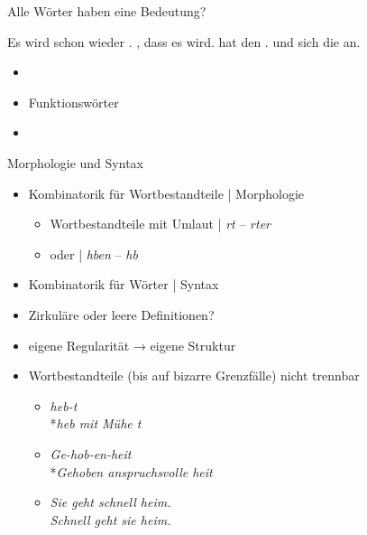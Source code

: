 \begin{frame}
  {Alle Wörter haben eine Bedeutung?}
  \onslide<+->
  \onslide<+->
  \begin{exe}
    \ex \alert{Es} \alert{wird} \alert{schon wieder} .
    \pause
    \ex {} , \alert{dass} \alert{es}  \alert{wird}.
    \pause
    \ex {} \alert{hat}  \alert{den} .
    \pause
    \ex {} \alert{und}   \alert{sich} \alert{die}  \alert{an}.  \end{exe}
  \Zeile
  \begin{itemize}[<+->]
    \item {}
    \item \alert{Funktionswörter}
    \item {}
  \end{itemize}
\end{frame}

\begin{frame}
  {Morphologie und Syntax}
  \pause
  \begin{itemize}[<+->]
    \item Kombinatorik für \alert{Wortbestandteile} | Morphologie
      \begin{itemize}[<+->]
        \item Wortbestandteile \zB mit \alert{Umlaut} | \textit{rt} -- \textit{rter}
        \item oder  | \textit{hben} -- \textit{hb}
      \end{itemize}
    \item Kombinatorik für \alert{Wörter} | Syntax
      \Zeile
    \item \alert{Zirkuläre oder leere Definitionen?} \onslide<+-> 
    \item eigene Regularität → eigene Struktur
      \Zeile
    \item Wortbestandteile (bis auf bizarre Grenzfälle) \alert{nicht trennbar}
      \begin{itemize}
        \item \textit{heb-t}\\
          *\textit{heb mit Mühe t}
        \item \textit{Ge-hob-en-heit} \\
          *\textit{Gehoben anspruchsvolle heit}
        \item \textit{Sie geht schnell heim.}\\
          \textit{Schnell geht sie heim.}
      \end{itemize}
  \end{itemize}
\end{frame}

